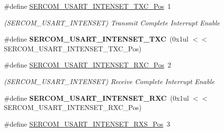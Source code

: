 \begin{DoxyCompactItemize}
\item 
\hypertarget{group___s_a_m_l21___s_e_r_c_o_m_gabb0bdb3b9cba5a32f899f5763f8d86c3}{}\#define \hyperlink{group___s_a_m_l21___s_e_r_c_o_m_gabb0bdb3b9cba5a32f899f5763f8d86c3}{S\+E\+R\+C\+O\+M\+\_\+\+U\+S\+A\+R\+T\+\_\+\+I\+N\+T\+E\+N\+S\+E\+T\+\_\+\+T\+X\+C\+\_\+\+Pos}~1\label{group___s_a_m_l21___s_e_r_c_o_m_gabb0bdb3b9cba5a32f899f5763f8d86c3}

\begin{DoxyCompactList}\small\item\em (S\+E\+R\+C\+O\+M\+\_\+\+U\+S\+A\+R\+T\+\_\+\+I\+N\+T\+E\+N\+S\+E\+T) Transmit Complete Interrupt Enable \end{DoxyCompactList}\item 
\hypertarget{group___s_a_m_l21___s_e_r_c_o_m_ga643efdaa93d7f051e49be61009f16e82}{}\#define {\bfseries S\+E\+R\+C\+O\+M\+\_\+\+U\+S\+A\+R\+T\+\_\+\+I\+N\+T\+E\+N\+S\+E\+T\+\_\+\+T\+X\+C}~(0x1ul $<$$<$ S\+E\+R\+C\+O\+M\+\_\+\+U\+S\+A\+R\+T\+\_\+\+I\+N\+T\+E\+N\+S\+E\+T\+\_\+\+T\+X\+C\+\_\+\+Pos)\label{group___s_a_m_l21___s_e_r_c_o_m_ga643efdaa93d7f051e49be61009f16e82}

\item 
\hypertarget{group___s_a_m_l21___s_e_r_c_o_m_ga359fbf2d33fd6545b853062232b6255e}{}\#define \hyperlink{group___s_a_m_l21___s_e_r_c_o_m_ga359fbf2d33fd6545b853062232b6255e}{S\+E\+R\+C\+O\+M\+\_\+\+U\+S\+A\+R\+T\+\_\+\+I\+N\+T\+E\+N\+S\+E\+T\+\_\+\+R\+X\+C\+\_\+\+Pos}~2\label{group___s_a_m_l21___s_e_r_c_o_m_ga359fbf2d33fd6545b853062232b6255e}

\begin{DoxyCompactList}\small\item\em (S\+E\+R\+C\+O\+M\+\_\+\+U\+S\+A\+R\+T\+\_\+\+I\+N\+T\+E\+N\+S\+E\+T) Receive Complete Interrupt Enable \end{DoxyCompactList}\item 
\hypertarget{group___s_a_m_l21___s_e_r_c_o_m_ga2602b783612126539b072619a5e12673}{}\#define {\bfseries S\+E\+R\+C\+O\+M\+\_\+\+U\+S\+A\+R\+T\+\_\+\+I\+N\+T\+E\+N\+S\+E\+T\+\_\+\+R\+X\+C}~(0x1ul $<$$<$ S\+E\+R\+C\+O\+M\+\_\+\+U\+S\+A\+R\+T\+\_\+\+I\+N\+T\+E\+N\+S\+E\+T\+\_\+\+R\+X\+C\+\_\+\+Pos)\label{group___s_a_m_l21___s_e_r_c_o_m_ga2602b783612126539b072619a5e12673}

\item 
\hypertarget{group___s_a_m_l21___s_e_r_c_o_m_gaf8f51e8adcd756a4b881f939fbf17717}{}\#define \hyperlink{group___s_a_m_l21___s_e_r_c_o_m_gaf8f51e8adcd756a4b881f939fbf17717}{S\+E\+R\+C\+O\+M\+\_\+\+U\+S\+A\+R\+T\+\_\+\+I\+N\+T\+E\+N\+S\+E\+T\+\_\+\+R\+X\+S\+\_\+\+Pos}~3\label{group___s_a_m_l21___s_e_r_c_o_m_gaf8f51e8adcd756a4b881f939fbf17717}


\end{DoxyCompactItemize}
